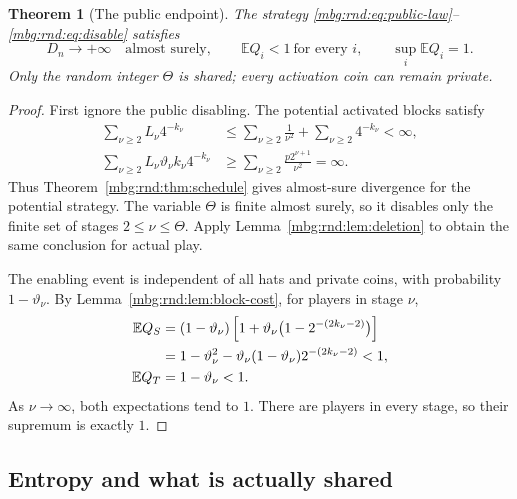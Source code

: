 \documentclass[11pt,letterpaper]{article}
\newtheorem{theorem}{Theorem}[section]
\theoremstyle{definition}
\newcommand{\E}{\mathbb E}
\begin{document}
\begin{theorem}[The public endpoint]
\label{mbg:rnd:thm:public-endpoint}
The strategy \eqref{mbg:rnd:eq:public-law}--\eqref{mbg:rnd:eq:disable} satisfies
\begin{equation}
 D_n\longrightarrow+\infty\quad\text{almost surely},
 \qquad
 \E Q_i<1\ \text{for every }i,
 \qquad
 \sup_i\E Q_i=1.
 \label{mbg:rnd:eq:public-conclusion}
\end{equation}
Only the random integer $\Theta$ is shared; every activation coin can remain
private.
\end{theorem}
\begin{proof}
First ignore the public disabling. The potential activated blocks
satisfy
\begin{align*}
 \sum_{\nu\ge2}L_\nu4^{-k_\nu}
 &\le\sum_{\nu\ge2}\frac1{\nu^2}+\sum_{\nu\ge2}4^{-k_\nu}<\infty,\\
 \sum_{\nu\ge2}L_\nu\vartheta_\nu k_\nu4^{-k_\nu}
 &\ge\sum_{\nu\ge2}\frac{p2^{\nu+1}}{\nu^2}=\infty.
\end{align*}
Thus Theorem~\ref{mbg:rnd:thm:schedule} gives almost-sure divergence for the potential
strategy. The variable $\Theta$ is finite almost surely, so it disables
only the finite set of stages $2\le \nu\le \Theta$. Apply
Lemma~\ref{mbg:rnd:lem:deletion} to obtain the same conclusion for actual play.

The enabling event is independent of all hats and private coins, with
probability $1-\vartheta_\nu$. By Lemma~\ref{mbg:rnd:lem:block-cost}, for players in
stage $\nu$,
\begin{align}
 \E Q_S
 &=(1-\vartheta_\nu)
       \left[1+\vartheta_\nu\bigl(1-2^{-(2k_\nu-2)}\bigr)\right]\notag\\
 &=1-\vartheta_\nu^2
       -\vartheta_\nu(1-\vartheta_\nu)2^{-(2k_\nu-2)}<1,
 \label{mbg:rnd:eq:public-cost-s}\\
 \E Q_T&=1-\vartheta_\nu<1.
 \label{mbg:rnd:eq:public-cost-t}
\end{align}
As $\nu\to\infty$, both expectations tend to $1$. There are players in
every stage, so their supremum is exactly $1$.
\end{proof}

\subsection{Entropy and what is actually shared}
\end{document}
